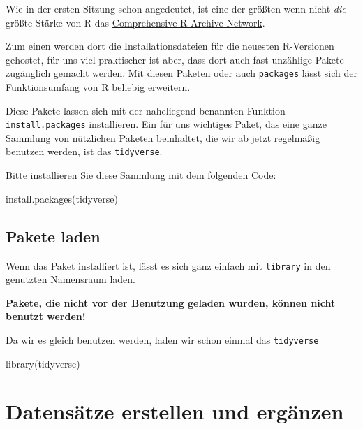 \documentclass[
]{book}
\newenvironment{Shaded}{\begin{snugshade}}{\end{snugshade}}
\newcommand{\FunctionTok}[1]{\textcolor[rgb]{0.00,0.00,0.00}{#1}}
\newcommand{\NormalTok}[1]{#1}
\newcommand{\StringTok}[1]{\textcolor[rgb]{0.31,0.60,0.02}{#1}}
\begin{document}
Wie in der ersten Sitzung schon angedeutet, ist eine der größten wenn nicht \emph{die} größte Stärke von R das \href{https://cran.r-project.org/}{Comprehensive R Archive Network}.

Zum einen werden dort die Installationsdateien für die neuesten R-Versionen gehostet, für uns viel praktischer ist aber, dass dort auch fast unzählige Pakete zugänglich gemacht werden. Mit diesen Paketen oder auch \texttt{packages} lässt sich der Funktionsumfang von R beliebig erweitern.

Diese Pakete lassen sich mit der naheliegend benannten Funktion \texttt{install.packages} installieren. Ein für uns wichtiges Paket, das eine ganze Sammlung von nützlichen Paketen beinhaltet, die wir ab jetzt regelmäßig benutzen werden, ist das \texttt{tidyverse}.

Bitte installieren Sie diese Sammlung mit dem folgenden Code:

\begin{Shaded}
\begin{Highlighting}[]
\FunctionTok{install.packages}\NormalTok{(}\StringTok{\textquotesingle{}tidyverse\textquotesingle{}}\NormalTok{)}
\end{Highlighting}
\end{Shaded}

\hypertarget{pakete-laden}{%
\subsection{Pakete laden}\label{pakete-laden}}

Wenn das Paket installiert ist, lässt es sich ganz einfach mit \texttt{library} in den genutzten Namensraum laden.

\textbf{Pakete, die nicht vor der Benutzung geladen wurden, können nicht benutzt werden!}

Da wir es gleich benutzen werden, laden wir schon einmal das \texttt{tidyverse}

\begin{Shaded}
\begin{Highlighting}[]
\FunctionTok{library}\NormalTok{(tidyverse)}
\end{Highlighting}
\end{Shaded}

\hypertarget{datensuxe4tze-erstellen-und-erguxe4nzen}{%
\section{Datensätze erstellen und ergänzen}\label{datensuxe4tze-erstellen-und-erguxe4nzen}}
\end{document}
